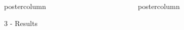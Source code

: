 \documentclass{beamer}
\newlength{\columnheight}
\begin{document}
\begin{frame}
\begin{columns}
\begin{column}{.499\textwidth}
\begin{beamercolorbox}[center]{postercolumn}
\begin{minipage}{.98\textwidth}
{\begin{myblock}{3 - Results}




\end{myblock}\vfill					

		}\end{minipage}\end{beamercolorbox}
	\end{column}
	
	\begin{column}{.249\textwidth}
		\begin{beamercolorbox}[center]{postercolumn}
			\begin{minipage}{.98\textwidth}  %
				\parbox[t][\columnheight]{\textwidth}{ %
				
}
\end{minipage}
\end{beamercolorbox}
\end{column}
\end{columns}
\end{frame}
\end{document}
